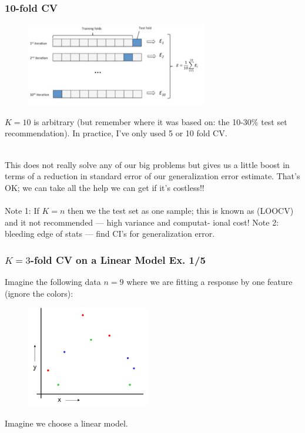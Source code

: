 \documentclass[handout]{beamer}
\begin{document}
\begin{frame}\frametitle{10-fold CV}

\begin{figure}
\centering
\includegraphics[width=3.1in]{10_fold_cv2.png}
\end{figure}

\vspace{-0.3cm}
\small
$K=10$ is arbitrary (but remember where it was based on: the 10-30\% test set recommendation). In practice, I've only used 5 or 10 fold CV. \\~\\ \pause

\vspace{-0.2cm}
This does not really solve any of our big problems but gives us a little boost in terms of a reduction in standard error of our generalization error estimate. \pause That's OK; we can take all the help we can get if it's costless!! \\~\\

\vspace{-0.2cm}\footnotesize
Note 1: If $K=n$ then we the test set as one sample; this is known as  (LOOCV) and it not recommended --- high variance and \pause computat- ional cost! \pause Note 2: bleeding edge of stats --- find CI's for generalization error.

	
\end{frame}


\begin{frame}\frametitle{$K=3$-fold CV on a Linear Model Ex. 1/5}

Imagine the following data $n=9$ where we are fitting a response by one feature (ignore the colors):

\begin{figure}
\centering
\includegraphics[width=2.1in]{data.PNG}
\end{figure}

Imagine we choose a linear model. 
	
\end{frame}
\end{document}
